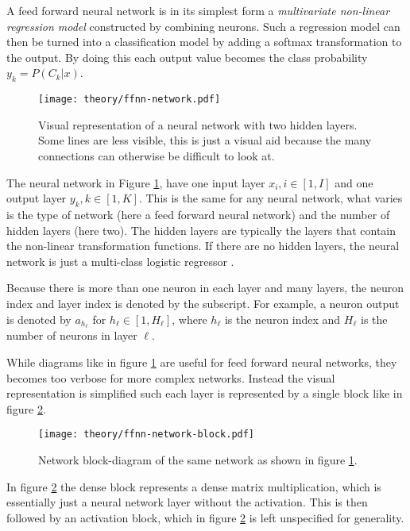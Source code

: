 A feed forward neural network is in its simplest form a \textit{multivariate non-linear regression model} constructed by combining neurons. Such a regression model can then be turned into a classification model by adding a softmax transformation \cite{the-elements-of-statistical-learning} to the output. By doing this each output value becomes the class probability $y_k = P(C_k | x)$.

\begin{figure}[h]
	\centering
	\texttt{[image: theory/ffnn-network.pdf]}
	\caption{Visual representation of a neural network with two hidden layers. Some lines are less visible, this is just a visual aid because the many connections can otherwise be difficult to look at.}
	\label{fig:theory:ffnn:network}
\end{figure}

The neural network in Figure \ref{fig:theory:ffnn:network}, have one input layer $x_i, i \in [1, I]$ and one output layer $y_k, k \in [1, K]$. This is the same for any neural network, what varies is the type of network (here a feed forward neural network) and the number of hidden layers (here two). The hidden layers are typically the layers that contain the non-linear transformation functions. If there are no hidden layers, the neural network is just a multi-class logistic regressor \cite{bishop}.

Because there is more than one neuron in each layer and many layers, the neuron index and layer index is denoted by the subscript. For example, a neuron output is denoted by $a_{h_{\ell}}$ for $h_{\ell} \in [1, H_{\ell}]$, where $h_{\ell}$ is the neuron index and $H_\ell$ is the number of neurons in layer $\ell$.

While diagrams like in figure \ref{fig:theory:ffnn:network} are useful for feed forward neural networks, they becomes too verbose for more complex networks. Instead the visual representation is simplified such each layer is represented by a single block like in figure \ref{fig:theory:ffnn:network-block}.

\begin{figure}[h]
	\centering
	\texttt{[image: theory/ffnn-network-block.pdf]}
	\caption{Network block-diagram of the same network as shown in figure \ref{fig:theory:ffnn:network}.}
	\label{fig:theory:ffnn:network-block}
\end{figure}

In figure \ref{fig:theory:ffnn:network-block} the dense block represents a dense matrix multiplication, which is essentially just a neural network layer without the activation. This is then followed by an activation block, which in figure \ref{fig:theory:ffnn:network-block} is left unspecified for generality.

